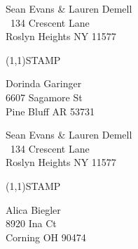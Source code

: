 \documentclass[12pt]{article}
\begin{document}
\clearpage

\begin{minipage}{.5\linewidth} \noindent
Sean Evans \& Lauren Demell\\\ 
134 Crescent Lane\\ 
Roslyn Heights NY 11577
\end{minipage}
\begin{minipage}{.5\linewidth \hspace{-.2in} \vspace{-.3in}}
\begin{flushright}
\framebox(1,1){STAMP}
\end{flushright}
\end{minipage}

\begin{center} \begin{Huge} \vspace*{\fill}
Dorinda Garinger\\
6607 Sagamore St\\
Pine Bluff AR 53731\\
\vspace{\fill} \end{Huge} \end{center}

\clearpage

\begin{minipage}{.5\linewidth} \noindent
Sean Evans \& Lauren Demell\\\ 
134 Crescent Lane\\ 
Roslyn Heights NY 11577
\end{minipage}
\begin{minipage}{.5\linewidth \hspace{-.2in} \vspace{-.3in}}
\begin{flushright}
\framebox(1,1){STAMP}
\end{flushright}
\end{minipage}

\begin{center} \begin{Huge} \vspace*{\fill}
Alica Biegler\\
8920 Ina Ct\\
Corning OH 90474\\
\vspace{\fill} \end{Huge} \end{center}

\clearpage
\end{document}
